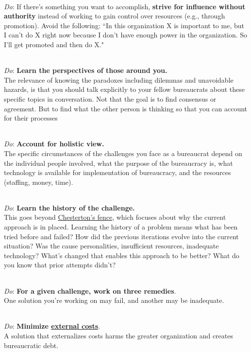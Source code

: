 \ \\
\textit{Do}: If there's something you want to accomplish, \textbf{strive for influence without authority} instead of working to gain control over resources (e.g., through promotion). Avoid the following: ``In this organization X is important to me, but I can't do X right now because I don't have enough power in the organization. So I'll get promoted and then do X."

\ \\
\textit{Do}: \textbf{Learn the perspectives of those around you.}\\
The relevance of knowing the paradoxes including dilemmas and unavoidable hazards, is that you should talk explicitly to your fellow bureaucrats about these specific topics in conversation. Not that the goal is to find consensus or agreement. But to find what the other person is thinking so that you can account for their processes

\ \\
\textit{Do}: \textbf{Account for holistic view.}\\
The specific circumstances of the challenges you face as a bureaucrat depend on the individual people involved, what the purpose of the bureaucracy is, what technology is available for implementation of bureaucracy, and the resources (staffing, money, time). 

\ \\
\textit{Do}: \textbf{Learn the history of the challenge.}\\
This goes beyond \href{https://en.wikipedia.org/wiki/G._K._Chesterton#Chesterton's_fence}{Chesterton's fence}, 
\iftoggle{WPinmargin}{\marginpar{[Wikipedia] Chesterton's\\fence}}{}
which focuses about why the current approach is in placed. Learning the history of a problem means what has been tried before and failed? How did the previous iterations evolve into the current situation? Was the cause personalities, insufficient resources, inadequate technology? What's changed that enables this approach to be better? What do you know that prior attempts didn't?

\ \\
\textit{Do}: \textbf{For a given challenge, work on three remedies}.\\
One solution you're working on may fail, and another may be inadequate. 

\ \\
\textit{Do}: \textbf{Minimize \href{https://en.wikipedia.org/wiki/Externality}{external costs}}.\\
\iftoggle{WPinmargin}{\marginpar{[Wikipedia] externality}}{}
A solution that externalizes costs harms the greater organization and creates bureaucratic debt.

